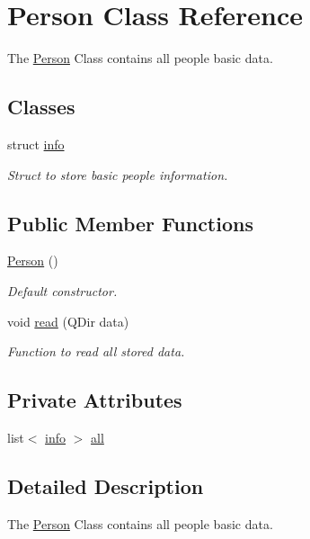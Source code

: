 \hypertarget{class_person}{\section{Person Class Reference}
\label{class_person}
}


The \hyperlink{class_person}{Person} Class contains all people basic data.  


\subsection*{Classes}
\begin{DoxyCompactItemize}
\item 
struct \hyperlink{struct_person_1_1info}{info}
\begin{DoxyCompactList}\small\item\em Struct to store basic people information. \end{DoxyCompactList}\end{DoxyCompactItemize}
\subsection*{Public Member Functions}
\begin{DoxyCompactItemize}
\item 
\hyperlink{class_person_a0397c6f89fafc12e738923f612bc41a3}{Person} ()
\begin{DoxyCompactList}\small\item\em Default constructor. \end{DoxyCompactList}\item 
void \hyperlink{class_person_a98c73f33a51b80cc9296a949f2fc5cf3}{read} (Q\+Dir data)
\begin{DoxyCompactList}\small\item\em Function to read all stored data. \end{DoxyCompactList}\end{DoxyCompactItemize}
\subsection*{Private Attributes}
\begin{DoxyCompactItemize}
\item 
list$<$ \hyperlink{struct_person_1_1info}{info} $>$ \hyperlink{class_person_a23d6ff8cb8e45c9e3502baffa6a0468a}{all}
\end{DoxyCompactItemize}


\subsection{Detailed Description}
The \hyperlink{class_person}{Person} Class contains all people basic data. 

